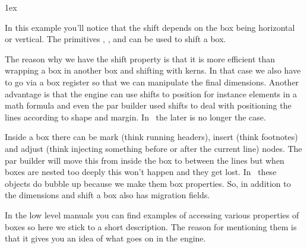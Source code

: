 \setbox\scratchboxone{}
\setbox\scratchboxtwo{}

\boxshift\scratchboxtwo 1ex \box\scratchboxone\box\scratchboxtwo
\stopbuffer

\typebuffer

In this example you'll notice that the shift depends on the box being horizontal
or vertical. The primitives \type {\raise}, \type {\lower}, \type {\moveleft} and
\type {\moveright} can be used to shift a box.

\startlinecorrection
\getbuffer
\stoplinecorrection

The reason why we have the shift property is that it is more efficient than
wrapping a box in another box and shifting with kerns. In that case we also have
to go via a box register so that we can manipulate the final dimensions. Another
advantage is that the engine can use shifts to position for instance elements in
a math formula and even the par builder used shifts to deal with positioning the
lines according to shape and margin. In \LUAMETATEX\ the later is no longer the
case.

Inside a box there can be mark (think running headers), insert (think footnotes)
and adjust (think injecting something before or after the current line) nodes. The
par builder will move this from inside the box to between the lines but when boxes
are nested too deeply this won't happen and they get lost. In \LUAMETATEX\ these
objects do bubble up because we make them box properties. So, in addition to
the dimensions and shift a box also has migration fields.

In the low level manuals you can find examples of accessing various properties of
boxes so here we stick to a short description. The reason for mentioning them is
that it gives you an idea of what goes on in the engine.

